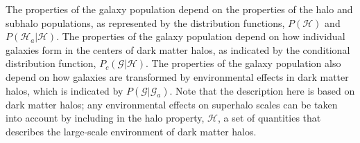 \documentclass[12pt,a4paper]{article}
\begin{document}
The properties of the galaxy population depend on the properties of the halo and subhalo populations, as represented by the distribution functions, $P(\mathscr{H})$ and $P(\mathscr{H}_a|\mathscr{H})$. The properties of the galaxy population depend on how individual galaxies form in the centers of dark matter halos, as indicated by the conditional distribution function, $P_c(\mathscr{G}|\mathscr{H})$. The properties of the galaxy population also depend on how galaxies are transformed by environmental effects in dark matter halos, which is indicated by $P(\mathscr{G}|\mathscr{G}_a)$. Note that the description here is based on dark matter halos; any environmental effects on superhalo scales can be taken into account by including in the halo property, $\mathscr{H}$, a set of quantities that describes the large-scale environment of dark matter halos.













\end{document}
